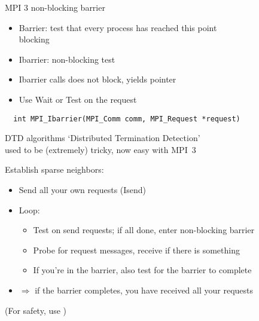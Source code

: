 \begin{frame}[fragile]{MPI 3 non-blocking barrier}
  \begin{itemize}
  \item Barrier: test that every process has reached this point\\
    blocking
  \item Ibarrier: non-blocking test
  \item Ibarrier calls does not block, yields  pointer
  \item Use Wait or Test on the request
  \end{itemize}
\begin{verbatim}
  int MPI_Ibarrier(MPI_Comm comm, MPI_Request *request)
\end{verbatim}
\end{frame}

\begin{frame}[fragile]{DTD algorithms}
  `Distributed Termination Detection'\\
  used to be (extremely) tricky, now easy with MPI~3

  Establish sparse neighbors:
  \begin{itemize}
  \item Send all your own requests (Isend)
  \item Loop:
    \begin{itemize}
    \item Test on send requests; if all done, enter non-blocking barrier
    \item Probe for request messages, receive if there is something
    \item If you're in the barrier, also test for the barrier to complete
    \end{itemize}
  \item $\Rightarrow$ if the barrier completes, you have received all your requests
  \end{itemize}
  (For safety, use )
\end{frame}


